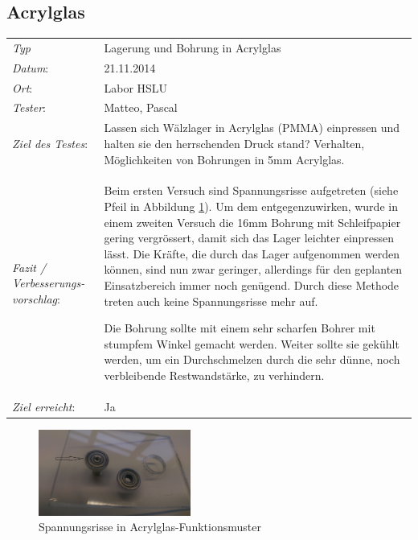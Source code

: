 \subsection{Acrylglas}
\begin{tabular}{p{3.6cm}p{9.4cm}}
	\textit{Typ}              & Lagerung und Bohrung in Acrylglas  \\ 
	\textit{Datum}:           & 21.11.2014   \\
	\textit{Ort}:             & Labor HSLU \\
	\textit{Tester}:          & Matteo, Pascal\\
	\textit{Ziel des Testes}: & Lassen sich Wälzlager in Acrylglas (PMMA) einpressen und halten sie den herrschenden Druck stand? Verhalten, Möglichkeiten von Bohrungen in 5mm Acrylglas.   \\
	\textit{Fazit / Verbesserungs-\newline vorschlag}: & Beim ersten Versuch sind Spannungsrisse aufgetreten (siehe Pfeil in Abbildung \ref{abb:LagerPlexiglas}). 
	Um dem entgegenzuwirken, wurde in einem zweiten Versuch die 16mm Bohrung mit 
	Schleifpapier gering vergrössert, damit sich das Lager leichter einpressen lässt. 
	Die Kräfte, die durch das Lager aufgenommen werden können, sind nun zwar 
	geringer, allerdings für den geplanten Einsatzbereich immer noch genügend. 
	Durch diese Methode treten auch keine Spannungsrisse mehr auf.  
	
	Die Bohrung sollte mit einem sehr scharfen Bohrer mit stumpfem Winkel 
	gemacht werden. Weiter sollte sie gekühlt werden, um ein Durchschmelzen 
	durch die sehr dünne, noch verbleibende Restwandstärke, zu verhindern.  \\
	\textit{Ziel erreicht}:& Ja\\
\end{tabular}
\begin{figure}[h!]
	\includegraphics[width=5cm]{Funktionstests/Bilder/LagerPlexiglas.jpg}
	\centering
	\caption{Spannungsrisse in Acrylglas-Funktionsmuster} 
	\label{abb:LagerPlexiglas}
\end{figure}